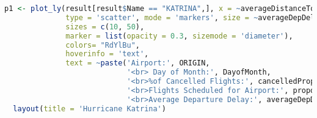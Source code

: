 \documentclass[12pt]{article}
\begin{document}
\begin{lstlisting}[language=R, caption= Sample Code forBubble Plots in R] 
p1 <- plot_ly(result[result$Name == "KATRINA",], x = ~averageDistanceToStorm, y = ~cancelledProp, 
              type = 'scatter', mode = 'markers', size = ~averageDepDelay , color = ~DayofMonthLabel,
              sizes = c(10, 50),
              marker = list(opacity = 0.3, sizemode = 'diameter'),
              colors= "RdYlBu",
              hoverinfo = 'text',
              text = ~paste('Airport:', ORIGIN,
                            '<br> Day of Month:', DayofMonth,
                            '<br>%of Cancelled Flights:', cancelledProp,
                            '<br>Flights Scheduled for Airport:', proportionFlights,
                            '<br>Average Departure Delay:', averageDepDelay))  %>% 
  layout(title = 'Hurricane Katrina')
\end{lstlisting}
\lstlistoflistings
\end{document}

